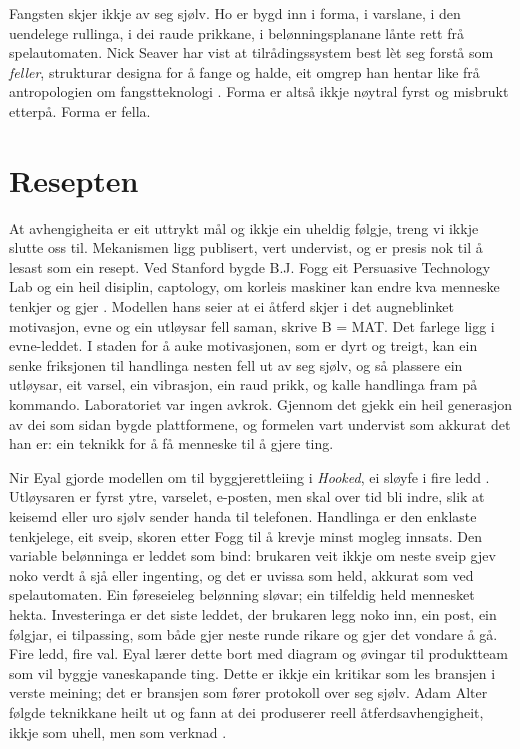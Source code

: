Fangsten skjer ikkje av seg sjølv. Ho er bygd inn i forma, i varslane, i den uendelege rullinga, i dei raude prikkane, i belønningsplanane lånte rett frå spelautomaten. Nick Seaver har vist at tilrådingssystem best lèt seg forstå som \emph{feller}, strukturar designa for å fange og halde, eit omgrep han hentar like frå antropologien om fangstteknologi \autocite{seaver2019captivating}. Forma er altså ikkje nøytral fyrst og misbrukt etterpå. Forma er fella.

\section{Resepten}

At avhengigheita er eit uttrykt mål og ikkje ein uheldig følgje, treng vi ikkje slutte oss til. Mekanismen ligg publisert, vert undervist, og er presis nok til å lesast som ein resept. Ved Stanford bygde B.J. Fogg eit Persuasive Technology Lab og ein heil disiplin, captology, om korleis maskiner kan endre kva menneske tenkjer og gjer \autocite{fogg2003}. Modellen hans seier at ei åtferd skjer i det augneblinket motivasjon, evne og ein utløysar fell saman, skrive B = MAT. Det farlege ligg i evne-leddet. I staden for å auke motivasjonen, som er dyrt og treigt, kan ein senke friksjonen til handlinga nesten fell ut av seg sjølv, og så plassere ein utløysar, eit varsel, ein vibrasjon, ein raud prikk, og kalle handlinga fram på kommando. Laboratoriet var ingen avkrok. Gjennom det gjekk ein heil generasjon av dei som sidan bygde plattformene, og formelen vart undervist som akkurat det han er: ein teknikk for å få menneske til å gjere ting.

Nir Eyal gjorde modellen om til byggjerettleiing i \textit{Hooked}, ei sløyfe i fire ledd \autocite{eyal2014hooked}. Utløysaren er fyrst ytre, varselet, e-posten, men skal over tid bli indre, slik at keisemd eller uro sjølv sender handa til telefonen. Handlinga er den enklaste tenkjelege, eit sveip, skoren etter Fogg til å krevje minst mogleg innsats. Den variable belønninga er leddet som bind: brukaren veit ikkje om neste sveip gjev noko verdt å sjå eller ingenting, og det er uvissa som held, akkurat som ved spelautomaten. Ein føreseieleg belønning sløvar; ein tilfeldig held mennesket hekta. Investeringa er det siste leddet, der brukaren legg noko inn, ein post, ein følgjar, ei tilpassing, som både gjer neste runde rikare og gjer det vondare å gå. Fire ledd, fire val. Eyal lærer dette bort med diagram og øvingar til produktteam som vil byggje vaneskapande ting. Dette er ikkje ein kritikar som les bransjen i verste meining; det er bransjen som fører protokoll over seg sjølv. Adam Alter følgde teknikkane heilt ut og fann at dei produserer reell åtferdsavhengigheit, ikkje som uhell, men som verknad \autocite{alter2017}.

